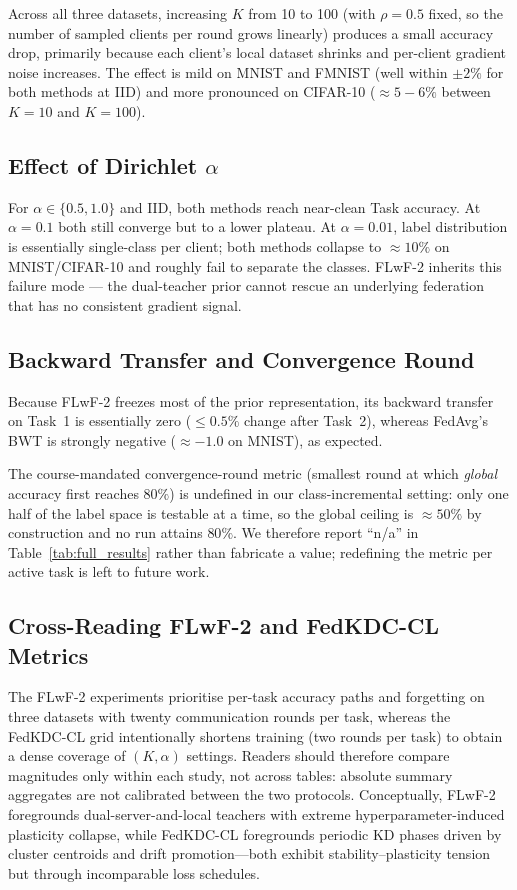 \documentclass[journal]{IEEEtran}
\begin{document}
Across all three datasets, increasing $K$ from 10 to 100 (with
$\rho{=}0.5$ fixed, so the number of sampled clients per round grows
linearly) produces a small accuracy drop, primarily because each
client's local dataset shrinks and per-client gradient noise
increases. The effect is mild on MNIST and FMNIST (well within
$\pm 2\%$ for both methods at IID) and more pronounced on CIFAR-10
($\approx 5{-}6\%$ between $K{=}10$ and $K{=}100$).

\subsection{Effect of Dirichlet $\alpha$}

For $\alpha\!\in\!\{0.5,1.0\}$ and IID, both methods reach near-clean
Task accuracy. At $\alpha\!=\!0.1$ both still converge but to a lower
plateau. At $\alpha\!=\!0.01$, label distribution is essentially
single-class per client; both methods collapse to $\approx 10\%$ on
MNIST/CIFAR-10 and roughly fail to separate the classes. FLwF-2
inherits this failure mode --- the dual-teacher prior cannot rescue an
underlying federation that has no consistent gradient signal.

\subsection{Backward Transfer and Convergence Round}

Because FLwF-2 freezes most of the prior representation, its backward
transfer on Task~1 is essentially zero ($\le 0.5\%$ change after
Task~2), whereas FedAvg's BWT is strongly negative ($\approx -1.0$ on
MNIST), as expected.

The course-mandated convergence-round metric (smallest round at which
\emph{global} accuracy first reaches $80\%$) is undefined in our
class-incremental setting: only one half of the label space is
testable at a time, so the global ceiling is $\approx 50\%$ by
construction and no run attains $80\%$. We therefore report ``n/a''
in Table~\ref{tab:full_results} rather than fabricate a value;
redefining the metric per active task is left to future work.

\subsection{Cross-Reading FLwF-2 and FedKDC-CL Metrics}

The FLwF-2 experiments prioritise per-task accuracy paths and forgetting on
three datasets with twenty communication rounds per task, whereas the FedKDC-CL
grid intentionally shortens training (two rounds per task) to obtain a dense
coverage of $(K,\alpha)$ settings. Readers should therefore compare magnitudes
only within each study, not across tables: absolute summary aggregates are not
calibrated between the two protocols. Conceptually, FLwF-2 foregrounds
dual-server-and-local teachers with extreme hyperparameter-induced plasticity
collapse, while FedKDC-CL foregrounds periodic KD phases driven by cluster
centroids and drift promotion---both exhibit stability--plasticity tension but
through incomparable loss schedules.
\end{document}
